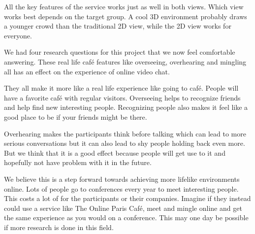 \documentclass[12pt, titlepage]{article}
\begin{document}
All the key features of the service works just as well in both views. Which view works best depends on the target group. A cool 3D environment probably draws a younger crowd than the traditional 2D view, while the 2D view works for everyone.

We had four research questions for this project that we now feel comfortable answering. These real life café features like overseeing, overhearing and mingling all has an effect on the experience of online video chat.

They all make it more like a real life experience like going to café. People will have a favorite café with regular visitors. Overseeing helps to recognize friends and help find new interesting people. Recognizing people also makes it feel like a good place to be if your friends might be there.

Overhearing makes the participants think before talking which can lead to more serious conversations but it can also lead to shy people holding back even more. But we think that it is a good effect because people will get use to it and hopefully not have problem with it in the future.

We believe this is a step forward towards achieving more lifelike environments online. Lots of people go to conferences every year to meet interesting people. This costs a lot of for the participants or their companies. Imagine if they instead could use a service like The Online Paris Café, meet and mingle online and get the same experience as you would on a conference. This may one day be possible if more research is done in this field.


\end{document}
